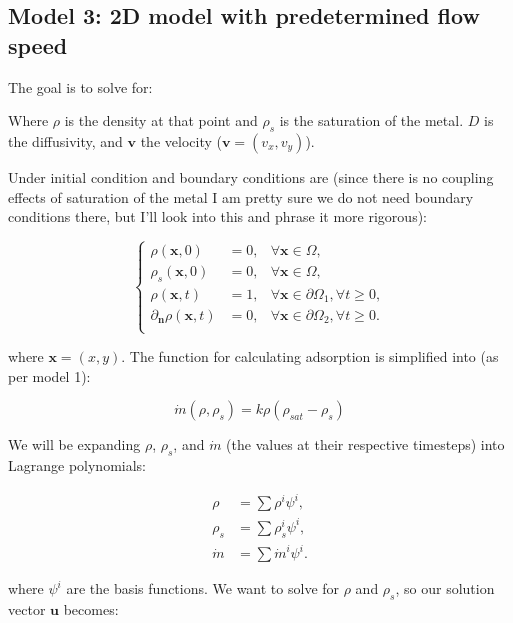 \subsection{Model 3: 2D model with predetermined flow speed}

The goal is to solve for:


Where $\rho$ is the density at that point and $\rho_s$ is the saturation of the metal. $D$ is the diffusivity, and $\mathbf{v}$ the velocity ($\mathbf v=(v_x, v_y)$).

Under initial condition and boundary conditions are (since there is no coupling effects of saturation of the metal I am pretty sure we do not need boundary conditions there, but I'll look into this and phrase it more rigorous):

\begin{equation}
\left\{ \begin{aligned}
    \rho(\mathbf{x}, 0)  &= 0, &\forall \mathbf{x}\in \Omega,\\
    \rho_s(\mathbf{x},0) &= 0, &\forall \mathbf{x}\in \Omega,\\
    \rho(\mathbf{x}, t)  &= 1, &\forall \mathbf{x}\in\partial\Omega_1,\forall t\geq 0, \\
    \partial_\mathbf{n}\rho(\mathbf{x}, t)  &= 0, &\forall \mathbf{x}\in\partial\Omega_2,\forall t\geq 0. \\
\end{aligned}\right.
\end{equation}

where $\mathbf x = (x, y)$. The function for calculating adsorption is simplified into (as per model 1):

\begin{equation*}
\dot m(\rho, \rho_s) = k\rho(\rho_{sat}-\rho_s)
\end{equation*}

We will be expanding $\rho$, $\rho_s$, and $\dot m$ (the values at their respective timesteps) into Lagrange polynomials:

\begin{equation*}
\begin{aligned}
\rho&=\sum{\rho^{i}\psi^i},\\
\rho_s&=\sum{\rho_s^{i}\psi^i},\\
\dot m&=\sum{\dot m^{i}\psi^i}.
\end{aligned}
\end{equation*}

where $\psi^i$ are the basis functions. We want to solve for $\rho$ and $\rho_s$, so our solution vector $\mathbf{u}$ becomes:

